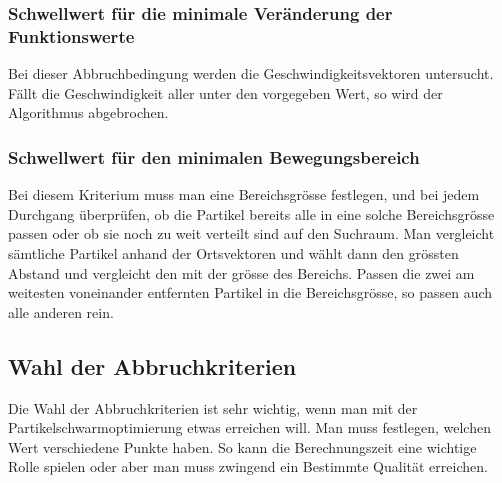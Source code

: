 \subsubsection{Schwellwert für die minimale Veränderung der Funktionswerte}
Bei dieser Abbruchbedingung werden die Geschwindigkeitsvektoren untersucht. Fällt die Geschwindigkeit aller unter den vorgegeben Wert, so wird der Algorithmus abgebrochen. 

\subsubsection{Schwellwert für den minimalen Bewegungsbereich}
Bei diesem Kriterium muss man eine Bereichsgrösse festlegen, und bei jedem Durchgang überprüfen, ob die Partikel bereits alle in eine solche Bereichsgrösse passen oder ob sie noch zu weit verteilt sind auf den Suchraum. Man vergleicht sämtliche Partikel anhand der Ortsvektoren und wählt dann den grössten Abstand und vergleicht den mit der grösse des Bereichs. Passen die zwei am weitesten voneinander entfernten Partikel in die Bereichsgrösse, so passen auch alle anderen rein.

\subsection{Wahl der Abbruchkriterien}
Die Wahl der Abbruchkriterien ist sehr wichtig, wenn man mit der Partikelschwarmoptimierung etwas erreichen will. Man muss festlegen, welchen Wert verschiedene Punkte haben. So kann die Berechnungszeit eine wichtige Rolle spielen oder aber man muss zwingend ein Bestimmte Qualität erreichen. 

